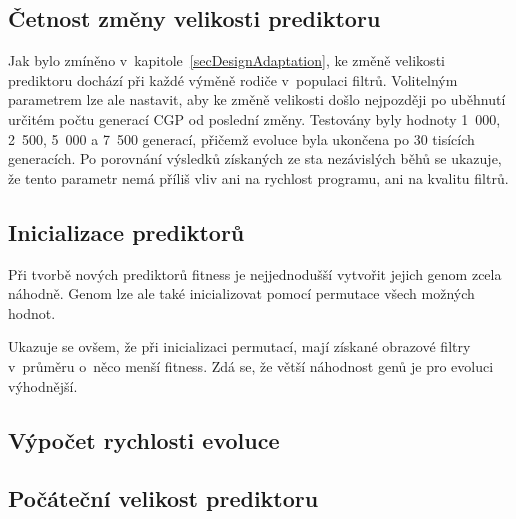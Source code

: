 \subsection{Četnost změny velikosti prediktoru}

Jak bylo zmíněno v~kapitole~\ref{secDesignAdaptation}, ke změně velikosti prediktoru dochází při každé výměně rodiče v~populaci filtrů. Volitelným parametrem lze ale nastavit, aby ke změně velikosti došlo nejpozději po uběhnutí určitém počtu generací CGP od poslední změny. Testovány byly hodnoty 1~000, 2~500, 5~000 a 7~500 generací, přičemž evoluce byla ukončena po 30 tisících generacích. Po porovnání výsledků získaných ze sta nezávislých běhů se ukazuje, že tento parametr nemá příliš vliv ani na rychlost programu, ani na kvalitu filtrů.


\subsection{Inicializace prediktorů}

Při tvorbě nových prediktorů fitness je nejjednodušší vytvořit jejich genom zcela náhodně.  Genom lze ale také inicializovat pomocí permutace všech možných hodnot.

Ukazuje se ovšem, že při inicializaci permutací, mají získané obrazové filtry v~průměru o~něco menší fitness. Zdá se, že větší náhodnost genů je pro evoluci výhodnější.


\subsection{Výpočet rychlosti evoluce}


\subsection{Počáteční velikost prediktoru}



